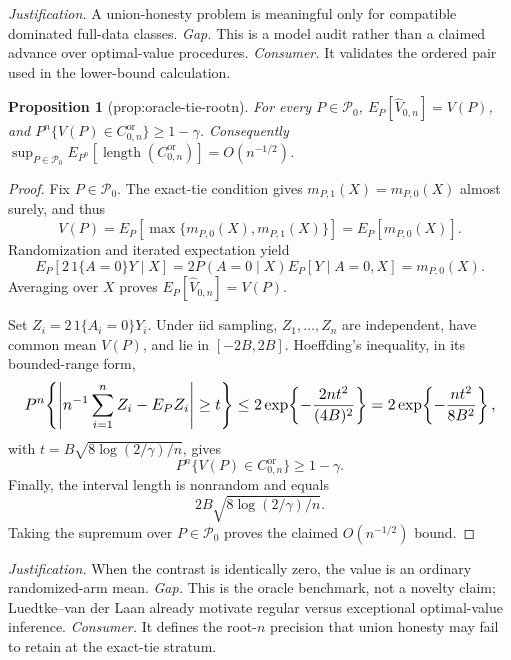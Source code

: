 \documentclass{article}
\newtheorem{proposition}{Proposition}
\begin{document}
\par\smallskip\noindent \textit{Justification.} A union-honesty problem is meaningful only for compatible dominated full-data classes. \textit{Gap.} This is a model audit rather than a claimed advance over optimal-value procedures. \textit{Consumer.} It validates the ordered pair used in the lower-bound calculation.

\begin{proposition}[prop:oracle-tie-rootn]\label{prop:oracle-tie-rootn}
For every \(P\in\mathcal P_0\), \(E_P[\widehat V_{0,n}]=V(P)\), and \(P^n\{V(P)\in C_{0,n}^{\mathrm{or}}\}\ge1-\gamma\).  Consequently \(\sup_{P\in\mathcal P_0}E_{P^n}[\operatorname{length}(C_{0,n}^{\mathrm{or}})]=O(n^{-1/2})\).
\end{proposition}
\begin{proof}
Fix \(P\in\mathcal P_0\).  The exact-tie condition gives \(m_{P,1}(X)=m_{P,0}(X)\) almost surely, and thus
\[
 V(P)=E_P[\max\{m_{P,0}(X),m_{P,1}(X)\}]=E_P[m_{P,0}(X)].
\]
Randomization and iterated expectation yield
\[
 E_P[2\,1\{A=0\}Y\mid X]
 =2P(A=0\mid X)E_P[Y\mid A=0,X]
 =m_{P,0}(X).
\]
Averaging over \(X\) proves \(E_P[\widehat V_{0,n}]=V(P)\).

Set \(Z_i=2\,1\{A_i=0\}Y_i\).  Under iid sampling, \(Z_1,\ldots,Z_n\) are independent, have common mean \(V(P)\), and lie in \([-2B,2B]\).  Hoeffding's inequality, in its bounded-range form,
\[
\makebox[\linewidth][c]{\resizebox{0.98\linewidth}{!}{\(\displaystyle P^n\!\left\{\left|n^{-1}\sum_{i=1}^n Z_i-E_PZ_i\right|\ge t\right\}
 \le 2\exp\!\left\{-\frac{2n t^2}{(4B)^2}\right\}
 =2\exp\!\left\{-\frac{nt^2}{8B^2}\right\},\)}}
\]
with \(t=B\sqrt{8\log(2/\gamma)/n}\), gives
\[
 P^n\{V(P)\in C_{0,n}^{\mathrm{or}}\}\ge1-\gamma.
\]
Finally, the interval length is nonrandom and equals
\[
 2B\sqrt{8\log(2/\gamma)/n}.
\]
Taking the supremum over \(P\in\mathcal P_0\) proves the claimed \(O(n^{-1/2})\) bound.
\end{proof}
\par\smallskip\noindent \textit{Justification.} When the contrast is identically zero, the value is an ordinary randomized-arm mean. \textit{Gap.} This is the oracle benchmark, not a novelty claim; Luedtke--van der Laan already motivate regular versus exceptional optimal-value inference. \textit{Consumer.} It defines the root-\(n\) precision that union honesty may fail to retain at the exact-tie stratum.
\end{document}

